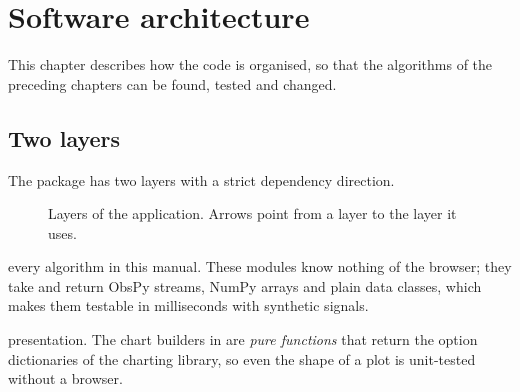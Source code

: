 \chapter{Software architecture}\label{ch:arch}

This chapter describes how the code is organised, so that the algorithms of the preceding chapters can be found, tested
and changed.

\section{Two layers}
The package  has two layers with a strict dependency direction.

\begin{figure}[tbp]
\centering
{}
\caption{Layers of the application. Arrows point from a layer to the layer it uses.}\label{fig:layers}
\end{figure}

\begin{description}[leftmargin=2.2cm,style=nextline]
\item[\code{core/}] every algorithm in this manual. These modules know nothing of the browser; they take and return ObsPy
  streams, NumPy arrays and plain data classes, which makes them testable in milliseconds with synthetic signals.
\item[\code{app/}] presentation. The chart builders in  are \emph{pure functions} that return the
  option dictionaries of the charting library, so even the shape of a plot is unit-tested without a browser.
\end{description}

